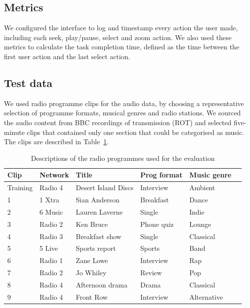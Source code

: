 \subsection{Metrics}
We configured the interface to log and timestamp every action the user made, including each seek, play/pause, select
and zoom action. We also used these metrics to calculate the task completion time, defined as the time between the
first user action and the last select action.


\subsection{Test data}
We used radio programme clips for the audio data, by choosing a representative selection of programme formats, musical
genres and radio stations.  We sourced the audio content from BBC recordings of transmission (ROT) and selected
five-minute clips that contained only one section that could be categorised as music.  The clips are described in
Table~\ref{tab:clips}.


\begin{table}[htbp]
  \begin{center}
    {\small
    \begin{tabular}{|l|l|l|l|l|l|}
      \hline
      \multicolumn{1}{|l|}{\textbf{Clip}} & \textbf{Network} & \textbf{Title} 
      & \textbf{Prog format} & \textbf{Music genre} \\ \hline
      Training & Radio 4 & Desert Island Discs & Interview & Ambient \\ \hline
      1 & 1 Xtra & Sian Anderson & Breakfast & Dance \\ \hline
      2 & 6 Music & Lauren Laverne & Single & Indie \\ \hline
      3 & Radio 2 & Ken Bruce & Phone quiz & Lounge \\ \hline
      4 & Radio 3 & Breakfast show & Single & Classical \\ \hline
      5 & 5 Live & Sports report & Sports & Band \\ \hline
      6 & Radio 1 & Zane Lowe & Interview & Rap \\ \hline
      7 & Radio 2 & Jo Whiley & Review & Pop \\ \hline
      8 & Radio 4 & Afternoon drama & Drama & Classical \\ \hline
      9 & Radio 4 & Front Row & Interview & Alternative \\ \hline
    \end{tabular}
    }
  \end{center}
  \caption{Descriptions of the radio programmes used for the evaluation}
  \label{tab:clips}
\end{table}

